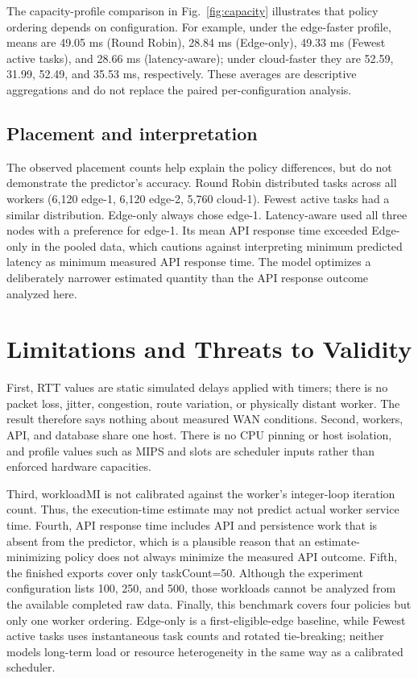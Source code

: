 \documentclass[conference]{IEEEtran}
\begin{document}
        The capacity-profile comparison in Fig.~\ref{fig:capacity} illustrates that policy ordering depends on configuration. For example, under the edge-faster profile, means are 49.05 ms (Round Robin), 28.84 ms (Edge-only), 49.33 ms (Fewest active tasks), and 28.66 ms (latency-aware); under cloud-faster they are 52.59, 31.99, 52.49, and 35.53 ms, respectively. These averages are descriptive aggregations and do not replace the paired per-configuration analysis.

        \subsection{Placement and interpretation}
        The observed placement counts help explain the policy differences, but do not demonstrate the predictor's accuracy. Round Robin distributed tasks across all workers (6,120 edge-1, 6,120 edge-2, 5,760 cloud-1). Fewest active tasks had a similar distribution. Edge-only always chose edge-1. Latency-aware used all three nodes with a preference for edge-1. Its mean API response time exceeded Edge-only in the pooled data, which cautions against interpreting minimum predicted latency as minimum measured API response time. The model optimizes a deliberately narrower estimated quantity than the API response outcome analyzed here.

        \section{Limitations and Threats to Validity}
        First, RTT values are static simulated delays applied with timers; there is no packet loss, jitter, congestion, route variation, or physically distant worker. The result therefore says nothing about measured WAN conditions. Second, workers, API, and database share one host. There is no CPU pinning or host isolation, and profile values such as MIPS and slots are scheduler inputs rather than enforced hardware capacities.

        Third, workloadMI is not calibrated against the worker's integer-loop iteration count. Thus, the execution-time estimate may not predict actual worker service time. Fourth, API response time includes API and persistence work that is absent from the predictor, which is a plausible reason that an estimate-minimizing policy does not always minimize the measured API outcome. Fifth, the finished exports cover only taskCount=50. Although the experiment configuration lists 100, 250, and 500, those workloads cannot be analyzed from the available completed raw data. Finally, this benchmark covers four policies but only one worker ordering. Edge-only is a first-eligible-edge baseline, while Fewest active tasks uses instantaneous task counts and rotated tie-breaking; neither models long-term load or resource heterogeneity in the same way as a calibrated scheduler.
\end{document}
